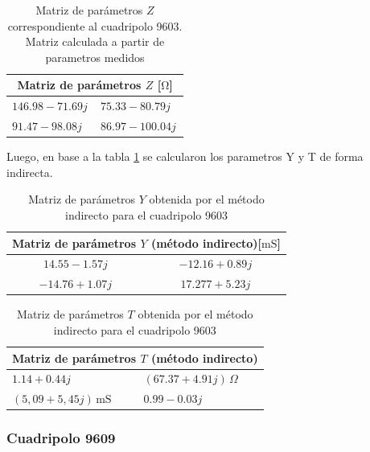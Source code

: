 \begin{table}[H]
\centering
\begin{tabular}{|l|l|}
\hline
\multicolumn{2}{|c|}{\textbf{Matriz de parámetros $Z$ [$\mathrm{\Omega}$]}} \\ \hline
$146.98 - 71.69j\,$ & $75.33 - 80.79j\,$ \\ \hline
$91.47 - 98.08j\,$ & $86.97 - 100.04j\,$ \\ \hline
\end{tabular}
\caption{Matriz de parámetros $Z$ correspondiente al cuadripolo 9603. Matriz calculada a partir de parametros medidos}
\label{tab:matriz_Z9603}
\end{table}

Luego, en base a la tabla \ref{tab:matriz_Z9603} se calcularon los parametros Y y T de forma indirecta.

\begin{table}[H]
\centering
\begin{tabular}{|c|c|}
\hline
\multicolumn{2}{|c|}{\textbf{Matriz de parámetros $Y$ (método indirecto)[$\mathrm{mS}$]}} \\ \hline
$14.55 - 1.57j\,$ & $-12.16 + 0.89j\,$ \\ \hline
$-14.76 + 1.07j\,$ & $17.277 + 5.23j\,$ \\ \hline
\end{tabular}
\caption{Matriz de parámetros $Y$ obtenida por el método indirecto para el cuadripolo 9603}
\label{tab:matriz_Y9603_indirecta}
\end{table}

\begin{table}[H]
\centering
\begin{tabular}{|l|l|}
\hline
\multicolumn{2}{|c|}{\textbf{Matriz de parámetros $T$ (método indirecto)}} \\ \hline
$1.14 + 0.44j$ & $(67.37 + 4.91j)\,\Omega$ \\ \hline
$(5,09 + 5,45j)\,\mathrm{mS}$ & $0.99 - 0.03j$ \\ \hline
\end{tabular}
\caption{Matriz de parámetros $T$ obtenida por el método indirecto para el cuadripolo 9603}
\label{tab:matriz_T9603_indirecta}
\end{table}
	
	\subsubsection*{Cuadripolo 9609}
	

